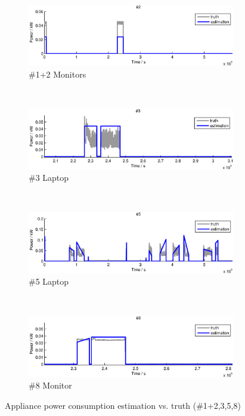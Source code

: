 \begin{figure}[p]
    \centering
    \begin{subfigure}[t]{\textwidth}
        \centering
        \includegraphics[width=\textwidth] {../../sw/pc/matlab/disagg-result/power-1-2.eps}
        \caption{\#1+2 Monitors}
    \end{subfigure} 
    \\
    \begin{subfigure}[t]{\textwidth}
        \centering
        \includegraphics[width=\textwidth] {../../sw/pc/matlab/disagg-result/power-3.eps}
        \caption{\#3 Laptop}
    \end{subfigure}
    \\
    \begin{subfigure}[t]{\textwidth}
        \centering
        \includegraphics[width=\textwidth] {../../sw/pc/matlab/disagg-result/power-5.eps}
        \caption{\#5 Laptop}
    \end{subfigure}
    \\
    \begin{subfigure}[t]{\textwidth}
        \centering
        \includegraphics[width=\textwidth] {../../sw/pc/matlab/disagg-result/power-8.eps}
        \caption{\#8 Monitor}
    \end{subfigure}
    \caption{Appliance power consumption estimation vs. truth (\#1+2,3,5,8)}\label{fig:power-1-2-3-5-8}
\end{figure}

